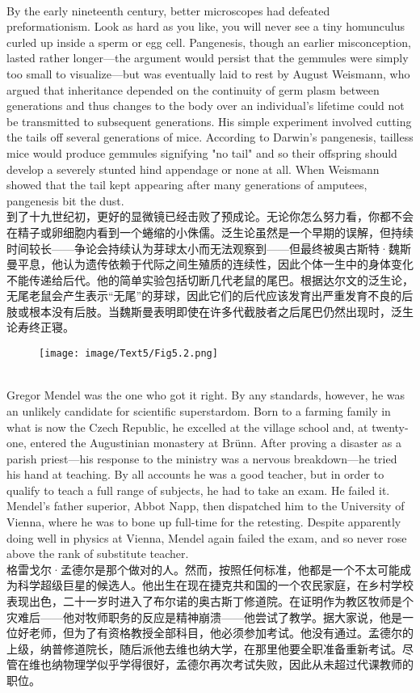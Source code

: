 \documentclass{article}
\begin{document}
\\
By the early nineteenth century, better microscopes had defeated preformationism. Look as hard as you like, you will never see a tiny homunculus curled up inside a sperm or egg cell. Pangenesis, though an earlier misconception, lasted rather longer—the argument would persist that the gemmules were simply too small to visualize—but was eventually laid to rest by August Weismann, who argued that inheritance depended on the continuity of germ plasm between generations and thus changes to the body over an individual's lifetime could not be transmitted to subsequent generations. His simple experiment involved cutting the tails off several generations of mice. According to Darwin's pangenesis, tailless mice would produce gemmules signifying "no tail" and so their offspring should develop a severely stunted hind appendage or none at all. When Weismann showed that the tail kept appearing after many generations of amputees, pangenesis bit the dust.\\
到了十九世纪初，更好的显微镜已经击败了预成论。无论你怎么努力看，你都不会在精子或卵细胞内看到一个蜷缩的小侏儒。泛生论虽然是一个早期的误解，但持续时间较长——争论会持续认为芽球太小而无法观察到——但最终被奥古斯特·魏斯曼平息，他认为遗传依赖于代际之间生殖质的连续性，因此个体一生中的身体变化不能传递给后代。他的简单实验包括切断几代老鼠的尾巴。根据达尔文的泛生论，无尾老鼠会产生表示“无尾”的芽球，因此它们的后代应该发育出严重发育不良的后肢或根本没有后肢。当魏斯曼表明即使在许多代截肢者之后尾巴仍然出现时，泛生论寿终正寝。\\

\begin{figure}
    \centering
    \texttt{[image: image/Text5/Fig5.2.png]}
\end{figure}

\\
Gregor Mendel was the one who got it right. By any standards, however, he was an unlikely candidate for scientific superstardom. Born to a farming family in what is now the Czech Republic, he excelled at the village school and, at twenty-one, entered the Augustinian monastery at Brünn. After proving a disaster as a parish priest—his response to the ministry was a nervous breakdown—he tried his hand at teaching. By all accounts he was a good teacher, but in order to qualify to teach a full range of subjects, he had to take an exam. He failed it. Mendel’s father superior, Abbot Napp, then dispatched him to the University of Vienna, where he was to bone up full-time for the retesting. Despite apparently doing well in physics at Vienna, Mendel again failed the exam, and so never rose above the rank of substitute teacher.\\
格雷戈尔·孟德尔是那个做对的人。然而，按照任何标准，他都是一个不太可能成为科学超级巨星的候选人。他出生在现在捷克共和国的一个农民家庭，在乡村学校表现出色，二十一岁时进入了布尔诺的奥古斯丁修道院。在证明作为教区牧师是个灾难后——他对牧师职务的反应是精神崩溃——他尝试了教学。据大家说，他是一位好老师，但为了有资格教授全部科目，他必须参加考试。他没有通过。孟德尔的上级，纳普修道院长，随后派他去维也纳大学，在那里他要全职准备重新考试。尽管在维也纳物理学似乎学得很好，孟德尔再次考试失败，因此从未超过代课教师的职位。\\
\end{document}
